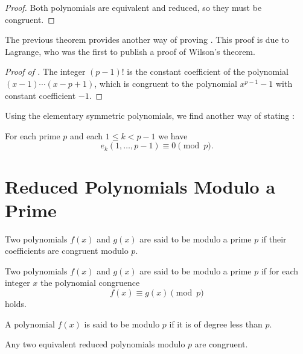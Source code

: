 \begin{proof}
  Both polynomials are equivalent and reduced, so they must be congruent.
\end{proof}

The previous theorem provides another way of proving . This proof is due to Lagrange, who was the first to publish a proof of Wilson's theorem.

\begin{proof}[Proof of ]
  The integer $(p-1)!$ is the constant coefficient of the polynomial $(x-1)\cdots(x-p+1)$, which is congruent to the polynomial $x^{p-1}-1$ with constant coefficient $-1$.
\end{proof}

Using the elementary symmetric polynomials, we find another way of stating :

\begin{theorem}
  For each prime $p$ and each $1\leq k < p-1$ we have
  \begin{equation*}
    e_k(1,\ldots,p-1) \equiv 0 \pmod{p}.
  \end{equation*}
\end{theorem}

\section{Reduced Polynomials Modulo a Prime}

\begin{definition}
  Two polynomials $f(x)$ and $g(x)$ are said to be  modulo a prime $p$ if their coefficients are congruent modulo $p$. 
\end{definition}

\begin{definition}
  Two polynomials $f(x)$ and $g(x)$ are said to be  modulo a prime $p$ if for each integer $x$ the polynomial congruence
  \begin{equation*}
    f(x)\equiv g(x)\pmod{p}
  \end{equation*}
  holds.
\end{definition}

\begin{definition}
  A polynomial $f(x)$ is said to be  modulo $p$ if it is of degree less than $p$.
\end{definition}

\begin{theorem}
  Any two equivalent reduced polynomials modulo $p$ are congruent.
\end{theorem}

